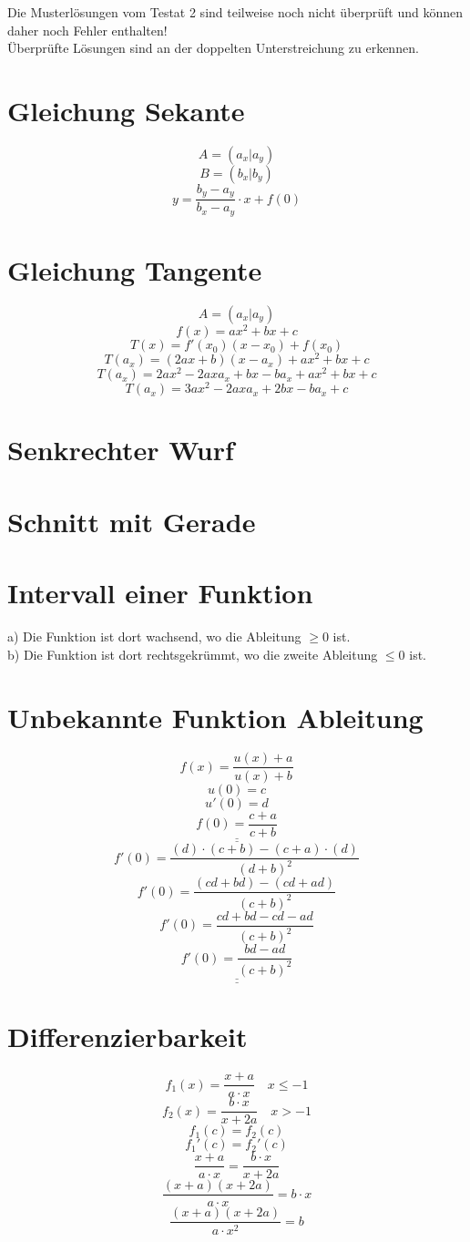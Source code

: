 Die Musterlösungen vom Testat 2 sind teilweise noch nicht überprüft und können daher noch Fehler enthalten! \\
Überprüfte Lösungen sind an der doppelten Unterstreichung zu erkennen. 
\section{Gleichung Sekante}
\[ A = (a_x | a_y) \]
\[ B = (b_x | b_y) \]
\[ y = \frac{b_y - a_y}{b_x - a_y} \cdot x + f(0) \]

\section{Gleichung Tangente}
\[ A = (a_x | a_y) \]
\[ f(x) = a x^2 + b x + c \]
\[ T(x) = f'(x_0)(x - x_0) + f(x_0) \]
\[ T(a_x) = (2 a x + b)(x - a_x) + a x^2 + b x + c \]
\[ T(a_x) = 2 a x^2 - 2 a x a_x + b x - b a_x + a x^2 + b x + c \]
\[ T(a_x) = 3 a x^2 - 2 a x a_x + 2 b x - b a_x + c \]

\section{Senkrechter Wurf}


\section{Schnitt mit Gerade}


\section{Intervall einer Funktion}
a) 
Die Funktion ist dort wachsend, wo die Ableitung $\geq 0$ ist. \\
b) 
Die Funktion ist dort rechtsgekrümmt, wo die zweite Ableitung $\leq 0$ ist. 

\section{Unbekannte Funktion Ableitung}
\[ f(x) = \frac{u(x) + a}{u(x) + b} \]
\[ u(0) = c \]
\[ u'(0) = d \]
\[ \underline{\underline{f(0) = \frac{c + a}{c + b}}} \]
\[ f'(0) = \frac{(d) \cdot (c + b) - (c + a) \cdot (d)}{(d + b)^2} \]
\[ f'(0) = \frac{(c d + b d) - (c d + a d)}{(c + b)^2} \]
\[ f'(0) = \frac{c d + b d - c d - a d}{(c + b)^2} \]
\[ \underline{\underline{f'(0) = \frac{b d - a d}{(c + b)^2}}} \]

\section{Differenzierbarkeit}
\[ f_1(x) = \frac{x + a}{a \cdot x} \quad x \leq -1 \]
\[ f_2(x) = \frac{b \cdot x}{x + 2 a} \quad x > -1 \]
\[ f_1(c) = f_2(c) \]
\[ f_1'(c) = f_2'(c) \]
\[ \frac{x + a}{a \cdot x} = \frac{b \cdot x}{x + 2 a} \]
\[ \frac{(x + a)(x + 2 a)}{a \cdot x} = b \cdot x \]
\[ \frac{(x + a)(x + 2 a)}{a \cdot x^2} = b \]

